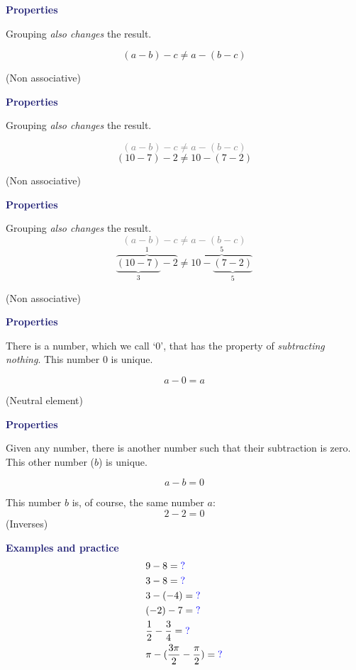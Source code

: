 \documentclass[landscape]{slides}
\newcommand{\colt}[1]{\textcolor{MidnightBlue}{\textbf{#1}}}
\newcommand{\sldt}[1]{\colt{\large #1}}
\begin{document}
\begin{slide}
  \sldt{Properties}

  Grouping \emph{also changes} the result.

  {\Large
    \[ (a-b) - c \neq a - (b-c)\]
  }

  \vfill
 \hfill
 (Non associative)
\end{slide}

\begin{slide}
  \sldt{Properties}

  Grouping \emph{also changes} the result.

  {\Large
    \textcolor{Gray}{\[ (a-b) - c \neq a - (b-c)\]}
    \[(10 - 7) - 2 \neq 10 - (7-2)\]
  }

  \vfill
 \hfill
 (Non associative)
\end{slide}

\begin{slide}
  \sldt{Properties}

  Grouping \emph{also changes} the result.
  {\Large
    \textcolor{Gray}{\[ (a-b) - c \neq a - (b-c)\]}
   \[\overbrace{\underbrace{(10 - 7)}_3 - 2}^1 \neq \overbrace{10 - \underbrace{(7-2)}_5}^5\]
 }

 \vfill
 \hfill
 (Non associative)
\end{slide}

\begin{slide}
  \sldt{Properties}

  There is a number, which we call `0',
  that has the property of \emph{subtracting nothing}.
  This number 0 is unique.

  {\Large
    \[ a - 0 = a\]
  }

  \vfill\hfill
  (Neutral element)
\end{slide}

\begin{slide}
  \sldt{Properties}

  Given any number,
  there is another number such
  that their subtraction is zero.
  This other number (\(b\)) is unique.

  {\Large
    \[ a - b = 0\]
  }

  This number \(b\) is, of course,
  the same number \(a\):
  {\Large
    \[ 2 - 2 = 0\]
  }
  \hfill (Inverses)
\end{slide}

\begin{slide}
  \sldt{Examples and practice}
  \newcommand{\qmk}{\textcolor{blue}{?}}
  \begin{eqnarray*}
    & 9-8 = \qmk \\
    & 3-8 = \qmk \\
    & 3-(-4) = \qmk \\
    & (-2)-7 = \qmk \\
    & \frac12 - \frac34 = \qmk\\
    & \pi - (\frac{3\pi}{2} - \frac\pi2) = \qmk
  \end{eqnarray*}
\end{slide}
\end{document}
